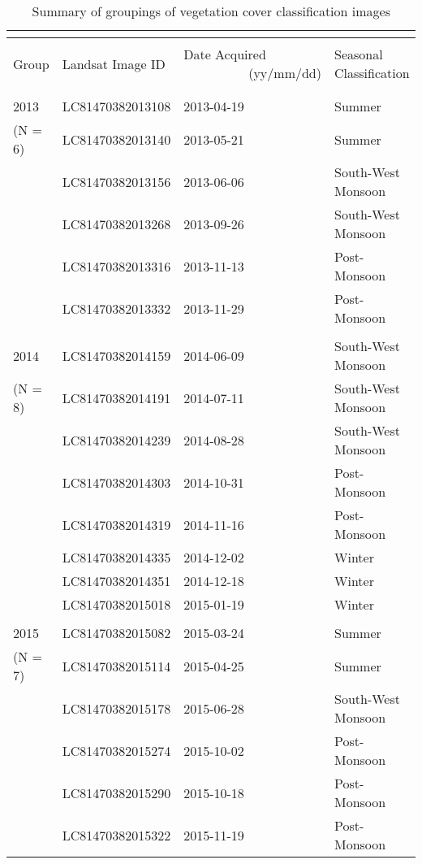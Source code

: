 \begin{ThreePartTable}
	\centering
	\small
	\def\arraystretch{1.3}
	\begin{longtable}{L{2.3cm} L{4.2cm} L{3.1cm} L{4.5cm}}
		\caption{Summary of groupings of vegetation cover classification images}
		\hskip15pt	
		\label{table14}\\
		\toprule[0.25mm]\\[-0.5cm]
		Group & Landsat Image ID & Date Acquired ~~~~~~~~~~(yy/mm/dd) & Seasonal Classification \\\\[-0.5cm]
		\midrule[0.35mm]\\[-0.4cm]
		2013 & LC81470382013108 & 2013-04-19 & Summer\\  
		(N = 6) & LC81470382013140 & 2013-05-21 & Summer\\
		& LC81470382013156 & 2013-06-06 & South-West Monsoon \\
		& LC81470382013268 & 2013-09-26 & South-West Monsoon \\
		& LC81470382013316 & 2013-11-13 & Post-Monsoon\\
		& LC81470382013332 & 2013-11-29 & Post-Monsoon \\\\[-0.3cm]
		2014& LC81470382014159 & 2014-06-09 & South-West Monsoon \\
		(N = 8)& LC81470382014191 & 2014-07-11 & South-West Monsoon  \\
		& LC81470382014239 & 2014-08-28 & South-West Monsoon \\
		& LC81470382014303 & 2014-10-31 & Post-Monsoon\\
		& LC81470382014319 & 2014-11-16 & Post-Monsoon \\
		& LC81470382014335 & 2014-12-02 & Winter \\
		& LC81470382014351 & 2014-12-18 & Winter \\
		& LC81470382015018 & 2015-01-19 & Winter \\\\[-0.3cm]
		2015& LC81470382015082 & 2015-03-24 & Summer \\
		(N = 7)& LC81470382015114 & 2015-04-25 & Summer \\
		& LC81470382015178 & 2015-06-28 & South-West Monsoon \\
		& LC81470382015274 & 2015-10-02 & Post-Monsoon \\
		& LC81470382015290 & 2015-10-18 & Post-Monsoon \\
		& LC81470382015322 & 2015-11-19 & Post-Monsoon \\

\end{longtable}
\end{ThreePartTable}
